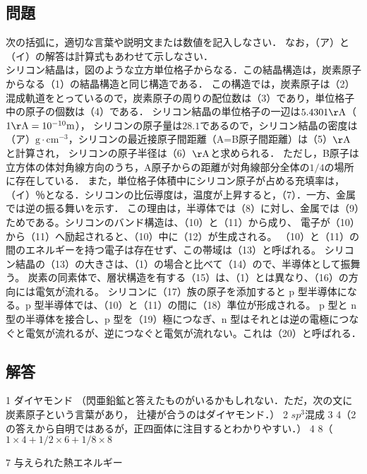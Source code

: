 \documentclass[dvipdfmx]{article}
\begin{document}
  \subsection*{問題} %
  次の括弧に，適切な言葉や説明文または数値を記入しなさい． なお，（ア）と（イ）の解答は計算式もあわせて示しなさい．\\
  シリコン結晶は，図のような立方単位格子からなる．この結晶構造は，炭素原子からなる（1）の結晶構造と同じ構造である．
  この構造では，炭素原子は（2）混成軌道をとっているので，炭素原子の周りの配位数は（3）であり，単位格子中の原子の個数は（4）である．
  シリコン結晶の単位格子の一辺は$ 5.4301\mathrm{\AA}$（$1 \mathrm{\AA}=10^{-10}\mathrm{m}$），
  シリコンの原子量は$28.1$であるので，シリコン結晶の密度は（ア）$\mathrm{g \cdot cm^{-3}}$，シリコンの最近接原子間距離（A=B原子間距離）は（5）$\mathrm{\AA}$ と計算され，
  シリコンの原子半径は（6）$\mathrm{\AA}$と求められる．
  ただし，B原子は立方体の体対角線方向のうち，A原子からの距離が対角線部分全体の$1/4$の場所に存在している．
  また，単位格子体積中にシリコン原子が占める充填率は，（イ）％となる．シリコンの比伝導度は，温度が上昇すると，（7）．一方、金属では逆の振る舞いを示す．
  この理由は，半導体では（8）に対し、金属では（9）ためである。シリコンのバンド構造は、（10）と（11）から成り、
  電子が（10）から（11）へ励起されると、（10）中に（12）が生成される。
  （10）と（11）の間のエネルギーを持つ電子は存在せず、この帯域は（13）と呼ばれる。
  シリコン結晶の（13）の大きさは、（1）の場合と比べて（14）ので、半導体として振舞う。
  炭素の同素体で、層状構造を有する（15）は、（1）とは異なり、（16）の方向には電気が流れる。
  シリコンに（17）族の原子を添加すると p 型半導体になる。p 型半導体では、（10）と（11）の間に（18）準位が形成される。
  p 型と n 型の半導体を接合し、p 型を（19）極につなぎ、n 型はそれとは逆の電極につなぐと電気が流れるが、逆につなぐと電気が流れない。これは（20）と呼ばれる．

  \subsection*{解答}
    1
    ダイヤモンド （閃亜鉛鉱と答えたものがいるかもしれない．ただ，次の文に炭素原子という言葉があり， 辻褄が合うのはダイヤモンド．）
    2 $sp^3$混成 
    3 4（2の答えから自明ではあるが，正四面体に注目するとわかりやすい．）
    4 8（$\mathrm 1 \times 4 + 1/2 \times 6 + 1/8 \times 8 $

    7 与えられた熱エネルギー
\end{document}
